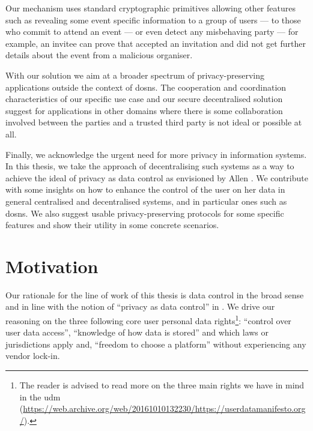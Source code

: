\documentclass[showtrims,oldfontcommands]{kthesis}
\begin{document}
Our mechanism uses standard cryptographic primitives allowing other features such 
as revealing some event specific information to a group of users --- to those who 
commit to attend an event --- or even detect any misbehaving party --- for example, 
an invitee can prove that accepted an invitation and did not get further details 
about the event from a malicious organiser.

With our solution we aim at a broader spectrum of privacy-preserving applications 
outside the context of \acp{dosn}. The cooperation and coordination characteristics 
of our specific use case and our secure decentralised solution suggest for applications 
in other domains where there is some collaboration involved between the parties 
and a trusted third party is not ideal or possible at all.

Finally, we acknowledge the urgent need for more privacy in information systems. 
In this thesis, we take the approach of decentralising such systems as a way to 
achieve the ideal of privacy as data control as envisioned by Allen \cite{Allen99}. 
We contribute with some insights on how to enhance the control of the user on her 
data in general centralised and decentralised systems, and in particular ones such 
as \acp{dosn}. We also suggest usable privacy-preserving protocols for some specific 
features and show their utility in some concrete scenarios.

%
%
%
%
%
%
%

\section{Motivation}
    \label{section:motivation}
Our rationale for the line of work of this thesis is data control in the broad sense 
and in line with the notion of ``privacy as data control'' in \cite{Allen99}. We 
drive our reasoning on the three following core user personal data rights\footnote{The 
reader is advised to read more on the three main rights we have in mind in the \Ac{udm} 
(\url{https://web.archive.org/web/20161010132230/https://userdatamanifesto.org/}).}: 
``control over user data access'', ``knowledge of how data is stored'' and which 
laws or jurisdictions apply and, ``freedom to choose a platform'' without experiencing 
any vendor lock-in.
\end{document}
